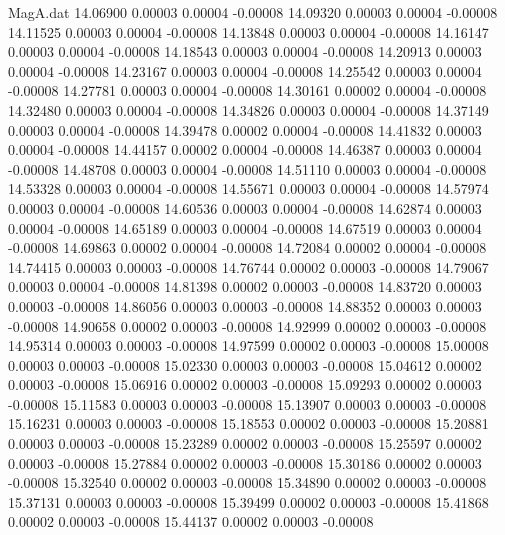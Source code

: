 \begin{filecontents}{MagA.dat}
  14.06900    0.00003    0.00004   -0.00008
  14.09320    0.00003    0.00004   -0.00008
  14.11525    0.00003    0.00004   -0.00008
  14.13848    0.00003    0.00004   -0.00008
  14.16147    0.00003    0.00004   -0.00008
  14.18543    0.00003    0.00004   -0.00008
  14.20913    0.00003    0.00004   -0.00008
  14.23167    0.00003    0.00004   -0.00008
  14.25542    0.00003    0.00004   -0.00008
  14.27781    0.00003    0.00004   -0.00008
  14.30161    0.00002    0.00004   -0.00008
  14.32480    0.00003    0.00004   -0.00008
  14.34826    0.00003    0.00004   -0.00008
  14.37149    0.00003    0.00004   -0.00008
  14.39478    0.00002    0.00004   -0.00008
  14.41832    0.00003    0.00004   -0.00008
  14.44157    0.00002    0.00004   -0.00008
  14.46387    0.00003    0.00004   -0.00008
  14.48708    0.00003    0.00004   -0.00008
  14.51110    0.00003    0.00004   -0.00008
  14.53328    0.00003    0.00004   -0.00008
  14.55671    0.00003    0.00004   -0.00008
  14.57974    0.00003    0.00004   -0.00008
  14.60536    0.00003    0.00004   -0.00008
  14.62874    0.00003    0.00004   -0.00008
  14.65189    0.00003    0.00004   -0.00008
  14.67519    0.00003    0.00004   -0.00008
  14.69863    0.00002    0.00004   -0.00008
  14.72084    0.00002    0.00004   -0.00008
  14.74415    0.00003    0.00003   -0.00008
  14.76744    0.00002    0.00003   -0.00008
  14.79067    0.00003    0.00004   -0.00008
  14.81398    0.00002    0.00003   -0.00008
  14.83720    0.00003    0.00003   -0.00008
  14.86056    0.00003    0.00003   -0.00008
  14.88352    0.00003    0.00003   -0.00008
  14.90658    0.00002    0.00003   -0.00008
  14.92999    0.00002    0.00003   -0.00008
  14.95314    0.00003    0.00003   -0.00008
  14.97599    0.00002    0.00003   -0.00008
  15.00008    0.00003    0.00003   -0.00008
  15.02330    0.00003    0.00003   -0.00008
  15.04612    0.00002    0.00003   -0.00008
  15.06916    0.00002    0.00003   -0.00008
  15.09293    0.00002    0.00003   -0.00008
  15.11583    0.00003    0.00003   -0.00008
  15.13907    0.00003    0.00003   -0.00008
  15.16231    0.00003    0.00003   -0.00008
  15.18553    0.00002    0.00003   -0.00008
  15.20881    0.00003    0.00003   -0.00008
  15.23289    0.00002    0.00003   -0.00008
  15.25597    0.00002    0.00003   -0.00008
  15.27884    0.00002    0.00003   -0.00008
  15.30186    0.00002    0.00003   -0.00008
  15.32540    0.00002    0.00003   -0.00008
  15.34890    0.00002    0.00003   -0.00008
  15.37131    0.00003    0.00003   -0.00008
  15.39499    0.00002    0.00003   -0.00008
  15.41868    0.00002    0.00003   -0.00008
  15.44137    0.00002    0.00003   -0.00008

\end{filecontents}
